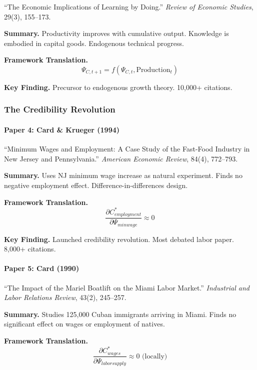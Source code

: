 ``The Economic Implications of Learning by Doing.''
\textit{Review of Economic Studies}, 29(3), 155--173.

\textbf{Summary.}
Productivity improves with cumulative output. Knowledge is embodied in 
capital goods. Endogenous technical progress.

\textbf{Framework Translation.}
\begin{equation}
\Psi_{C,t+1} = f(\Psi_{C,t}, \text{Production}_t)
\end{equation}

\textbf{Key Finding.}
Precursor to endogenous growth theory. 10,000+ citations.

\subsubsection{The Credibility Revolution}

\paragraph{Paper 4: Card \& Krueger (1994)}

``Minimum Wages and Employment: A Case Study of the Fast-Food Industry 
in New Jersey and Pennsylvania.''
\textit{American Economic Review}, 84(4), 772--793.

\textbf{Summary.}
Uses NJ minimum wage increase as natural experiment. Finds no negative 
employment effect. Difference-in-differences design.

\textbf{Framework Translation.}
\begin{equation}
\frac{\partial C^*_{employment}}{\partial \Psi_{min wage}} \approx 0
\end{equation}

\textbf{Key Finding.}
Launched credibility revolution. Most debated labor paper. 8,000+ citations.

\paragraph{Paper 5: Card (1990)}

``The Impact of the Mariel Boatlift on the Miami Labor Market.''
\textit{Industrial and Labor Relations Review}, 43(2), 245--257.

\textbf{Summary.}
Studies 125,000 Cuban immigrants arriving in Miami. Finds no significant 
effect on wages or employment of natives.

\textbf{Framework Translation.}
\begin{equation}
\frac{\partial C^*_{wages}}{\partial \Psi_{labor supply}} \approx 0 \text{ (locally)}
\end{equation}

